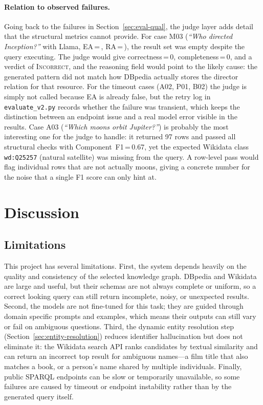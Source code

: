 \documentclass[11pt,a4paper]{article}
\newcommand{\cmark}{\ding{51}}%
\newcommand{\xmark}{\ding{55}}%
\begin{document}
\paragraph{Relation to observed failures.}
Going back to the failures in Section~\ref{sec:eval-qual}, the judge
layer adds detail that the structural metrics cannot provide. For
case M03 (\emph{``Who directed Inception?''} with Llama,
EA\,=\,\cmark, RA\,=\,\xmark), the result set was empty despite the
query executing. The judge would give correctness\,=\,0,
completeness\,=\,0, and a verdict of \textsc{Incorrect}, and the
reasoning field would point to the likely cause: the generated pattern
did not match how DBpedia actually stores the director relation for
that resource. For the timeout cases (A02, P01, B02) the judge is
simply not called because EA is already false, but the retry log in
\texttt{evaluate\_v2.py} records whether the failure was transient,
which keeps the distinction between an endpoint issue and a real model
error visible in the results. Case A03 (\emph{``Which moons orbit
Jupiter?''}) is probably the most interesting one for the judge to
handle: it returned 97 rows and passed all structural checks with
Component~F1\,=\,0.67, yet the expected Wikidata class
\texttt{wd:Q25257} (natural satellite) was missing from the query.
A row-level pass would flag individual rows that are not actually
moons, giving a concrete number for the noise that a single F1 score
can only hint at.

\section{Discussion}
\label{sec:discussion}


\subsection{Limitations}
\label{sec:limitations}
This project has several limitations. First, the system depends heavily on the quality and consistency of the selected knowledge graph. DBpedia and Wikidata are large and useful, but their schemas are not always complete or uniform, so a correct looking query can still return incomplete, noisy, or unexpected results. Second, the models are not fine-tuned for this task; they are guided through domain specific prompts and examples, which means their outputs can still vary or fail on ambiguous questions. Third, the dynamic entity resolution step (Section~\ref{sec:entity-resolution}) reduces identifier hallucination but does not eliminate it: the Wikidata search API ranks candidates by textual similarity and can return an incorrect top result for ambiguous names---a film title that also matches a book, or a person's name shared by multiple individuals. Finally, public SPARQL endpoints can be slow or temporarily unavailable, so some failures are caused by timeout or endpoint instability rather than by the generated query itself. 
\end{document}
